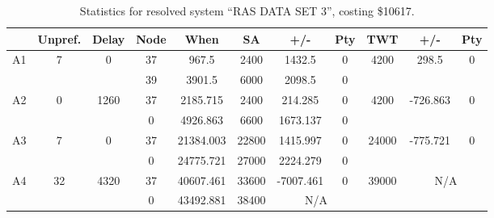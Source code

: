 \begin{sidewaystable}
\footnotesize
\caption{Statistics for resolved system ``RAS DATA SET 3'', costing \$10617.}
\centering
\begin{tabular}{c||c|c||c|c|c|c|c||c|c|c}
  \hline \hline
  &
  Unpref. & 
  Delay &
  Node &
  When &
  SA &
  +/- &
  Pty &
  TWT &
  +/- &
  Pty \\
      \hline
      \multirow{2}{*}{A1} &
      \multirow{2}{*}{7} &
      \multirow{2}{*}{0} &
      37 &
      967.5 &
      2400 &
        1432.5 &
        0 &
      \multirow{2}{*}{4200} &
        \multirow{2}{*}{298.5} &
        \multirow{2}{*}{0}
      \\
      \cline{4-8}
       &
       &
       &
      39 &
      3901.5 &
      6000 &
        2098.5 &
        0 &
      
         &
        
      \\
      \hline
      \multirow{2}{*}{A2} &
      \multirow{2}{*}{0} &
      \multirow{2}{*}{1260} &
      37 &
      2185.715 &
      2400 &
        214.285 &
        0 &
      \multirow{2}{*}{4200} &
        \multirow{2}{*}{-726.863} &
        \multirow{2}{*}{0}
      \\
      \cline{4-8}
       &
       &
       &
      0 &
      4926.863 &
      6600 &
        1673.137 &
        0 &
      
         &
        
      \\
      \hline
      \multirow{2}{*}{A3} &
      \multirow{2}{*}{7} &
      \multirow{2}{*}{0} &
      37 &
      21384.003 &
      22800 &
        1415.997 &
        0 &
      \multirow{2}{*}{24000} &
        \multirow{2}{*}{-775.721} &
        \multirow{2}{*}{0}
      \\
      \cline{4-8}
       &
       &
       &
      0 &
      24775.721 &
      27000 &
        2224.279 &
        0 &
      
         &
        
      \\
      \hline
      \multirow{2}{*}{A4} &
      \multirow{2}{*}{32} &
      \multirow{2}{*}{4320} &
      37 &
      40607.461 &
      33600 &
        -7007.461 &
        0 &
      \multirow{2}{*}{39000} &
        \multicolumn{2}{c}{\multirow{2}{*}{N/A}}
      \\
      \cline{4-8}
       &
       &
       &
      0 &
      43492.881 &
      38400 &
        \multicolumn{2}{|c||}{N/A} &
      

\end{tabular}
\end{sidewaystable}
